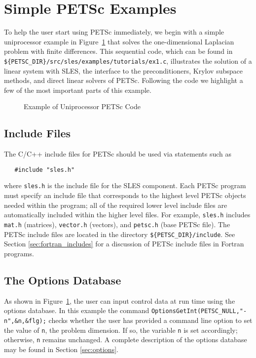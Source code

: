 \section{Simple PETSc Examples}

\label{sec:simple}

To help the user start using PETSc immediately, we begin with a simple
uniprocessor example in Figure~\ref{fig:example1} that solves the
one-dimensional Laplacian problem with finite differences.  This
sequential code, which can be found in 
{\tt \$\{PETSC\_DIR\}/src/sles/examples/tutorials/ex1.c},
illustrates the solution of a linear system with SLES, the 
interface to the preconditioners, Krylov subspace methods, and direct
linear solvers of PETSc.  Following the code we highlight a few of the most important
parts of this example.  

\begin{figure}[H]
{\footnotesize
{}
}
\caption{Example of Uniprocessor PETSc Code}
\label{fig:example1}
\end{figure}

\subsection*{Include Files}

The C/C++ include files for PETSc should be used via statements such as
\begin{verbatim}
   #include "sles.h"
\end{verbatim}
where {\tt sles.h} is the include file for the SLES component.
Each PETSc program must specify an
include file that corresponds to the highest level PETSc objects
needed within the program; all of the required lower level include
files are automatically included within the higher level files.  For
example, {\tt sles.h} includes {\tt mat.h} (matrices),
{\tt vector.h} (vectors), and {\tt petsc.h} (base PETSc file).  
The PETSc include files are located in the directory 
{\tt \$\{PETSC\_DIR\}/include}.  See Section \ref{sec:fortran_includes}
for a discussion of PETSc include files in Fortran programs.

\subsection*{The Options Database}

As shown in Figure~\ref{fig:example1}, the user can input control data
at run time using the options database. In this example the command
{\tt OptionsGetInt(PETSC\_NULL,"-n",\&n,\&flg);} checks whether the user has
provided a command line option to set the value of {\tt n}, the
problem dimension.  If so, the variable {\tt n} is set accordingly;
otherwise, {\tt n} remains unchanged. A complete description of the
options database may be found in Section \ref{sec:options}.

